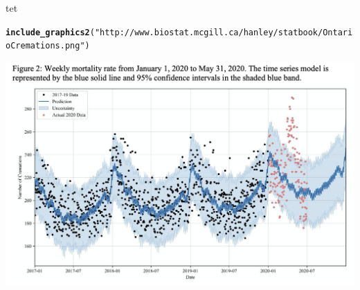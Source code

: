 \documentclass{beamer}\usepackage[]{graphicx}\usepackage[]{color}
\makeatletter
\newcommand{\hlstr}[1]{\textcolor[rgb]{0.192,0.494,0.8}{#1}}%
\newcommand{\hlstd}[1]{\textcolor[rgb]{0.345,0.345,0.345}{#1}}%
\newcommand{\hlkwd}[1]{\textcolor[rgb]{0.737,0.353,0.396}{\textbf{#1}}}%
\newenvironment{kframe}{%
 \def\at@end@of@kframe{}%
 \ifinner\ifhmode%
  \def\at@end@of@kframe{\end{minipage}}%
  \begin{minipage}{\columnwidth}%
 \fi\fi%
 \def\FrameCommand##1{\hskip\@totalleftmargin \hskip-\fboxsep
 \colorbox{shadecolor}{##1}\hskip-\fboxsep
     \hskip-\linewidth \hskip-\@totalleftmargin \hskip\columnwidth}%
 \MakeFramed {\advance\hsize-\width
   \@totalleftmargin\z@ \linewidth\hsize
   \@setminipage}}%
 {\par\unskip\endMakeFramed%
 \at@end@of@kframe}
\newenvironment{knitrout}{}{} %
\makeatother
\begin{document}
\begin{frame}[fragile]{tet}
	
	
\begin{knitrout}\scriptsize
{}\color{fgcolor}\begin{kframe}
\begin{alltt}
\hlkwd{include_graphics2}\hlstd{(}\hlstr{"http://www.biostat.mcgill.ca/hanley/statbook/OntarioCremations.png"}\hlstd{)}
\end{alltt}
\end{kframe}

{\centering \includegraphics[width=1\linewidth]{downloadFigs4latex_002-motivating-examples/named-chunk} 

}



\end{knitrout}
	
	
\end{frame}
\end{document}
